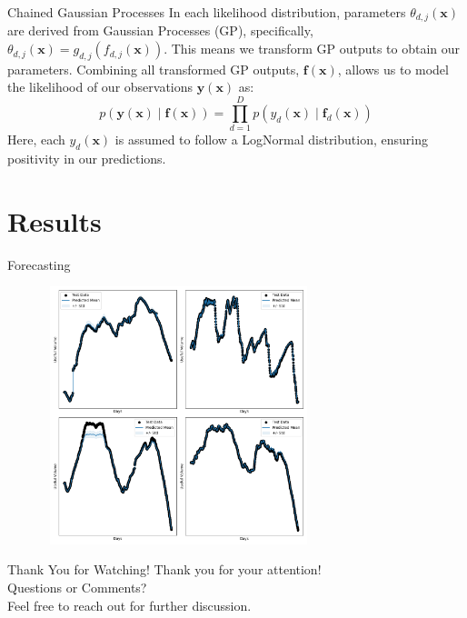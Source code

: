 \documentclass[10pt, xcolor=table]{beamer}
\begin{document}
\begin{frame}{Chained Gaussian Processes}
In each likelihood distribution, parameters $\theta_{d,j}(\mathbf{x})$ are derived from Gaussian Processes (GP), specifically, $\theta_{d,j}(\mathbf{x}) = g_{d,j}(f_{d,j}(\mathbf{x}))$. This means we transform GP outputs to obtain our parameters. Combining all transformed GP outputs, $\mathbf{f}(\mathbf{x})$, allows us to model the likelihood of our observations $\mathbf{y}(\mathbf{x})$ as:
\begin{equation*}
p(\mathbf{y}(\mathbf{x}) \mid \mathbf{f}(\mathbf{x})) = \prod_{d=1}^D p(y_{d}(\mathbf{x})\mid \mathbf{f}_{d}(\mathbf{x}))
\end{equation*}
Here, each $y_{d}(\mathbf{x})$ is assumed to follow a LogNormal distribution, ensuring positivity in our predictions.
\end{frame}


\section*{Results}

\begin{frame}{Forecasting}
    \begin{figure}
    \centering
    \includegraphics[width=0.7\textwidth, height=7.5cm]{images/predictions_test.png}
\end{figure}
\end{frame}





\begin{frame}{Thank You for Watching!}
\centering
\Large{Thank you for your attention!}\\
\vspace{10mm} %
\large{Questions or Comments?}\\
\vspace{5mm} %
\large{Feel free to reach out for further discussion.}
\end{frame}
\end{document}

